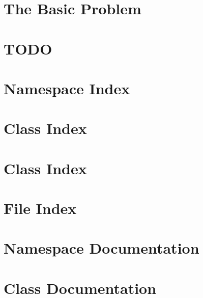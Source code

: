 \documentclass{book}
\begin{document}
\chapter{The Basic Problem}
\label{md_the_basic_problem}
\hypertarget{md_the_basic_problem}{}

\chapter{T\-O\-D\-O}
\label{md_todo}
\hypertarget{md_todo}{}

\chapter{Namespace Index}

\chapter{Class Index}

\chapter{Class Index}

\chapter{File Index}

\chapter{Namespace Documentation}



\chapter{Class Documentation}


















\end{document}
